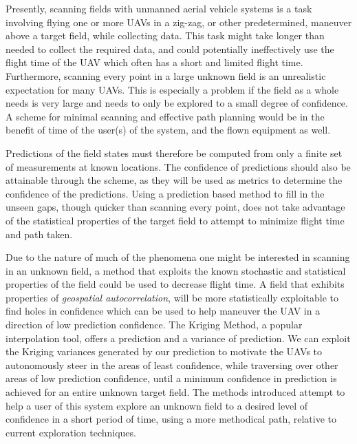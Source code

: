 Presently, scanning fields with unmanned aerial vehicle systems is a task involving flying one or more UAVs in a zig-zag, or other predetermined, maneuver above a target field, while collecting data. This task might take longer than needed to collect the required data, and could potentially ineffectively use the flight time of the UAV which often has a short and limited flight time. Furthermore, scanning every point in a large unknown field is an unrealistic expectation for many UAVs. This is especially a problem if the field as a whole needs is very large and needs to only be explored to a small degree of confidence. A scheme for minimal scanning and effective path planning would be in the benefit of time of the user(s) of the system, and the flown equipment as well. 

Predictions of the field states must therefore be computed from only a finite set of measurements at known locations. The confidence of predictions should also be attainable through the scheme, as they will be used as metrics to determine the confidence of the predictions. Using a prediction based method to fill in the unseen gaps, though quicker than scanning every point, does not take advantage of the statistical properties of the target field to attempt to minimize flight time and path taken. 

Due to the nature of much of the phenomena one might be interested in scanning in an unknown field, a method that exploits the known stochastic and statistical properties of the field could be used to decrease flight time. A field that exhibits properties of \textit{geospatial autocorrelation}, will be more statistically exploitable to find holes in confidence which can be used to help maneuver the UAV in a direction of low prediction confidence. The Kriging Method, a popular interpolation tool, offers a prediction and a variance of prediction. We can exploit the Kriging variances generated by our prediction to motivate the UAVs to autonomously steer in the areas of least confidence, while traversing over other areas of low prediction confidence, until a minimum confidence in prediction is achieved for an entire unknown target field. The methods introduced attempt to help a user of this system explore an unknown field to a desired level of confidence in a short period of time, using a more methodical path, relative to current exploration techniques. 
